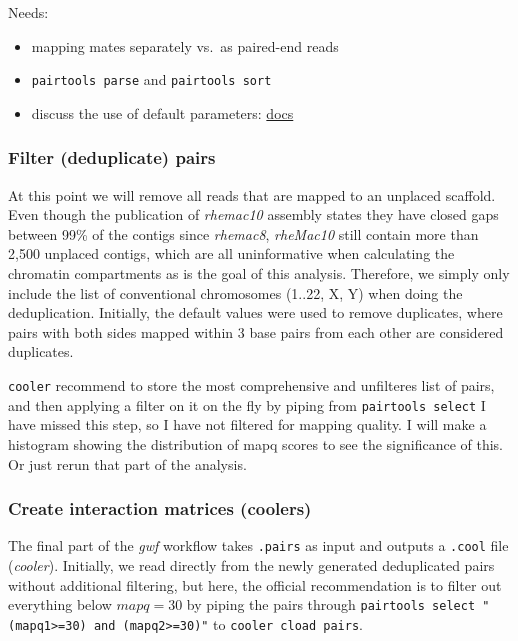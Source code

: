 \documentclass[
  a4paper,
]{scrbook}
\providecommand{\tightlist}{%
  \setlength{\itemsep}{0pt}\setlength{\parskip}{0pt}}\usepackage{longtable,booktabs,array}
\let\oldemph\emph
\renewcommand\emph[1]{\oldemph{\color{gray}#1}}
\begin{document}
Needs:

\begin{itemize}
\tightlist
\item
  mapping mates separately vs.~as paired-end reads
\item
  \texttt{pairtools\ parse} and \texttt{pairtools\ sort}
\item
  discuss the use of default parameters:
  \href{https://pairtools.readthedocs.io/en/latest/protocols_pipelines.html\#recommended-pairtools-parameters-for-standard-hi-c-protocols}{docs}
\end{itemize}

\subsubsection{Filter (deduplicate)
pairs}\label{filter-deduplicate-pairs}

At this point we will remove all reads that are mapped to an unplaced
scaffold. Even though the publication of \emph{rhemac10} assembly states
they have closed gaps between 99\% of the contigs since \emph{rhemac8},
\emph{rheMac10} still contain more than 2,500 unplaced contigs, which
are all uninformative when calculating the chromatin compartments as is
the goal of this analysis. Therefore, we simply only include the list of
conventional chromosomes (1..22, X, Y) when doing the deduplication.
Initially, the default values were used to remove duplicates, where
pairs with both sides mapped within 3 base pairs from each other are
considered duplicates.

\texttt{cooler} recommend to store the most comprehensive and unfilteres
list of pairs, and then applying a filter on it on the fly by piping
from \texttt{pairtools\ select} I have missed this step, so I have not
filtered for mapping quality. I will make a histogram showing the
distribution of mapq scores to see the significance of this. Or just
rerun that part of the analysis.

\subsubsection{Create interaction matrices
(coolers)}\label{create-interaction-matrices-coolers}

The final part of the \emph{gwf} workflow takes \texttt{.pairs} as input
and outputs a \texttt{.cool} file (\emph{cooler}). Initially, we read
directly from the newly generated deduplicated pairs without additional
filtering, but here, the official recommendation is to filter out
everything below \(mapq = 30\) by piping the pairs through
\texttt{pairtools\ select\ "(mapq1\textgreater{}=30)\ and\ (mapq2\textgreater{}=30)"}
to \texttt{cooler\ cload\ pairs}.
\end{document}
